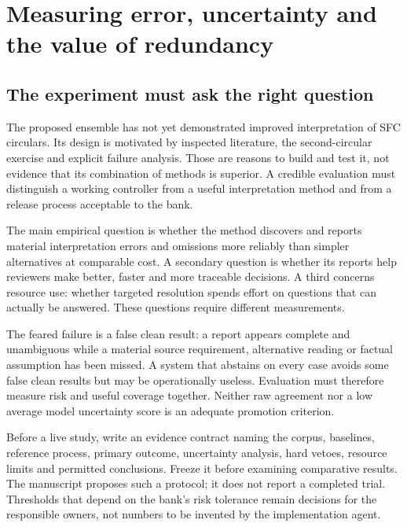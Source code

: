 \chapter{Measuring error, uncertainty and the value of redundancy}
\label{ch:evaluation}

\section{The experiment must ask the right question}
\label{merge:M09:00}


The proposed ensemble has not yet demonstrated improved interpretation of SFC
circulars. Its design is motivated by inspected literature, the second-circular
exercise and explicit failure analysis. Those are reasons to build and test it,
not evidence that its combination of methods is superior. A credible evaluation
must distinguish a working controller from a useful interpretation method and
from a release process acceptable to the bank.

The main empirical question is whether the method discovers and reports material
interpretation errors and omissions more reliably than simpler alternatives at
comparable cost. A secondary question is whether its reports help reviewers make
better, faster and more traceable decisions. A third concerns resource use:
whether targeted resolution spends effort on questions that can actually be
answered. These questions require different measurements.

The feared failure is a false clean result: a report appears complete and
unambiguous while a material source requirement, alternative reading or factual
assumption has been missed. A system that abstains on every case avoids some false
clean results but may be operationally useless. Evaluation must therefore measure
risk and useful coverage together. Neither raw agreement nor a low average model
uncertainty score is an adequate promotion criterion.

Before a live study, write an evidence contract naming the corpus, baselines,
reference process, primary outcome, uncertainty analysis, hard vetoes, resource
limits and permitted conclusions. Freeze it before examining comparative results.
The manuscript proposes such a protocol; it does not report a completed trial.
Thresholds that depend on the bank's risk tolerance remain decisions for the
responsible owners, not numbers to be invented by the implementation agent.


